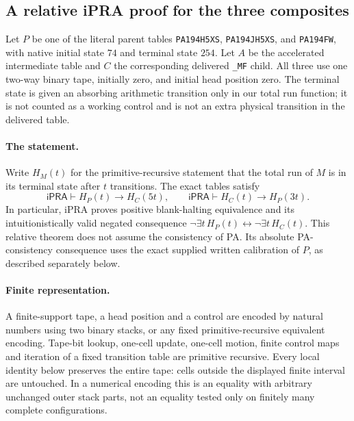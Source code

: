\subsection{A relative iPRA proof for the three composites}
\label{sec:symmetric-mf}

Let $P$ be one of the literal parent tables
\texttt{PA194H5XS}, \texttt{PA194JH5XS}, and \texttt{PA194FW}, with native initial state $74$
and terminal state $254$.  Let $A$ be the accelerated intermediate table
and $C$ the corresponding delivered \texttt{\_MF} child.  All three use
one two-way binary tape, initially zero, and initial head position zero.
The terminal state is given an absorbing arithmetic transition only in
our total run function; it is not counted as a working control and is
not an extra physical transition in the delivered table.

\paragraph{The statement.}
Write $H_M(t)$ for the primitive-recursive statement that the total run
of $M$ is in its terminal state after $t$ transitions.  The exact tables
satisfy
\[
 \mathsf{iPRA}\vdash H_P(t)\longrightarrow H_C(5t),
 \qquad
 \mathsf{iPRA}\vdash H_C(t)\longrightarrow H_P(3t).
 \tag{SMF}
\]
In particular, iPRA proves positive blank-halting equivalence and its
intuitionistically valid negated consequence
$\neg\exists t\,H_P(t)\leftrightarrow\neg\exists t\,H_C(t)$.
This relative theorem does not assume the consistency of PA.
Its absolute PA-consistency consequence uses the exact supplied written
calibration of $P$, as described separately below.

\paragraph{Finite representation.}
A finite-support tape, a head position and a control are encoded by
natural numbers using two binary stacks, or any fixed primitive-recursive
equivalent encoding.  Tape-bit lookup, one-cell update, one-cell motion,
finite control maps and iteration of a fixed transition table are primitive
recursive.  Every local identity below preserves the entire tape: cells
outside the displayed finite interval are untouched.  In a numerical
encoding this is an equality with arbitrary unchanged outer stack parts,
not an equality tested only on finitely many complete configurations.

